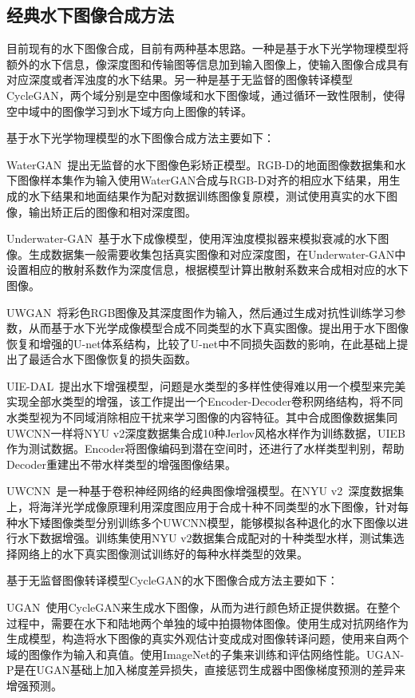 \subsection{经典水下图像合成方法}
目前现有的水下图像合成，目前有两种基本思路。一种是基于水下光学物理模型将额外的水下信息，像深度图和传输图等信息加到输入图像上，使输入图像合成具有对应深度或者浑浊度的水下结果。另一种是基于无监督的图像转译模型CycleGAN，两个域分别是空中图像域和水下图像域，通过循环一致性限制，使得空中域中的图像学习到水下域方向上图像的转译。

基于水下光学物理模型的水下图像合成方法主要如下：

WaterGAN~\cite{li2017watergan}提出无监督的水下图像色彩矫正模型。RGB-D的地面图像数据集和水下图像样本集作为输入使用WaterGAN合成与RGB-D对齐的相应水下结果，用生成的水下结果和地面结果作为配对数据训练图像复原模，测试使用真实的水下图像，输出矫正后的图像和相对深度图。

Underwater-GAN~\cite{yu2018underwater}基于水下成像模型，使用浑浊度模拟器来模拟衰减的水下图像。生成数据集一般需要收集包括真实图像和对应深度图，在Underwater-GAN中设置相应的散射系数作为深度信息，根据模型计算出散射系数来合成相对应的水下图像。

UWGAN~\cite{wang2019uwgan}将彩色RGB图像及其深度图作为输入，然后通过生成对抗性训练学习参数，从而基于水下光学成像模型合成不同类型的水下真实图像。提出用于水下图像恢复和增强的U-net体系结构，比较了U-net中不同损失函数的影响，在此基础上提出了最适合水下图像恢复的损失函数。


UIE-DAL~\cite{uplavikar2019all}提出水下增强模型，问题是水类型的多样性使得难以用一个模型来完美实现全部水类型的增强，该工作提出一个Encoder-Decoder卷积网络结构，将不同水类型视为不同域消除相应干扰来学习图像的内容特征。其中合成图像数据集同UWCNN一样将NYU v2深度数据集合成10种Jerlov风格水样作为训练数据，UIEB作为测试数据。Encoder将图像编码到潜在空间时，还进行了水样类型判别，帮助Decoder重建出不带水样类型的增强图像结果。

UWCNN~\cite{li2020underwater}是一种基于卷积神经网络的经典图像增强模型。在NYU v2~\cite{Silberman:ECCV12}深度数据集上，将海洋光学成像原理利用深度图应用于合成十种不同类型的水下图像，针对每种水下矮图像类型分别训练多个UWCNN模型，能够模拟各种退化的水下图像以进行水下数据增强。训练集使用NYU v2数据集合成配对的十种类型水样，测试集选择网络上的水下真实图像测试训练好的每种水样类型的效果。

基于无监督图像转译模型CycleGAN的水下图像合成方法主要如下：

UGAN~\cite{fabbri2018enhancing}使用CycleGAN来生成水下图像，从而为进行颜色矫正提供数据。在整个过程中，需要在水下和陆地两个单独的域中拍摄物体图像。使用生成对抗网络作为生成模型，构造将水下图像的真实外观估计变成成对图像转译问题，使用来自两个域的图像作为输入和真值。使用ImageNet的子集来训练和评估网络性能。UGAN-P是在UGAN基础上加入梯度差异损失，直接惩罚生成器中图像梯度预测的差异来增强预测。

